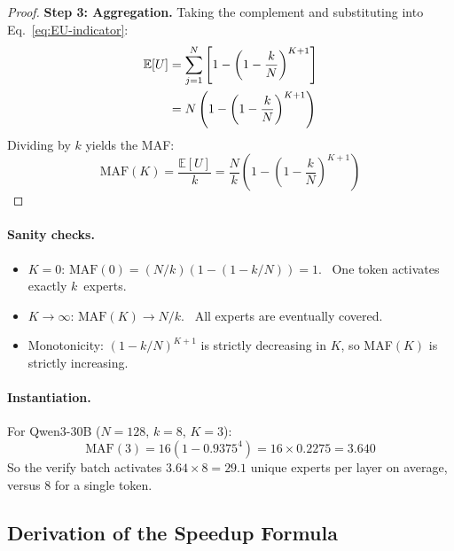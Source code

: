 \documentclass[letterpaper,twocolumn,10pt]{article}
\newcommand{\maf}{MAF\xspace}
\begin{document}
\begin{appendices}
\begin{proof}
\textbf{Step 3: Aggregation.}
Taking the complement and substituting into Eq.~\eqref{eq:EU-indicator}:
\begin{align}
  \mathbb{E}[U]
  &= \sum_{j=1}^{N} \left[
       1 - \left(1 - \frac{k}{N}\right)^{K+1}
     \right] \notag\\
  &= N\left(1 - \left(1 - \frac{k}{N}\right)^{K+1}\right)
     \label{eq:EU-closed}
\end{align}
Dividing by $k$ yields the \maf:
\begin{equation}\label{eq:maf-app}
  \text{MAF}(K)
  = \frac{\mathbb{E}[U]}{k}
  = \frac{N}{k}\!\left(1 - \left(1-\frac{k}{N}\right)^{K+1}\right)
\end{equation}
\end{proof}

\paragraph{Sanity checks.}
\begin{itemize}[leftmargin=*,itemsep=1pt]
\item $K\!=\!0$: $\text{MAF}(0) = (N/k)(1-(1-k/N)) = 1$. \checkmark\
  One token activates exactly $k$~experts.
\item $K \to \infty$: $\text{MAF}(K) \to N/k$. \checkmark\
  All experts are eventually covered.
\item Monotonicity: $(1-k/N)^{K+1}$ is strictly decreasing in $K$, so
  MAF$(K)$ is strictly increasing. \checkmark
\end{itemize}

\paragraph{Instantiation.}
For Qwen3-30B ($N\!=\!128$, $k\!=\!8$, $K\!=\!3$):
\begin{equation}\label{eq:maf-qwen}
  \text{MAF}(3) = 16\!\left(1 - 0.9375^4\right)
  = 16 \times 0.2275 = 3.640
\end{equation}
So the verify batch activates $3.64 \times 8 = 29.1$ unique experts per
layer on average, versus $8$ for a single token.

\subsection{Derivation of the Speedup Formula}\label{app:speedup-proof}


\end{appendices}
\end{document}
